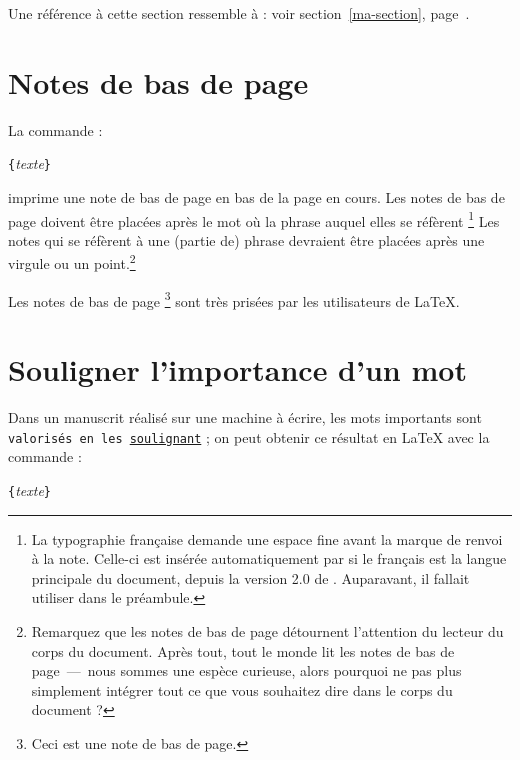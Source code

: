 \begin{example}
Une référence à cette
section\label{ma-section}
ressemble à :
\og voir section~\ref{ma-section},
page~\pageref{ma-section}.\fg
\end{example}

\section{Notes de bas de page}
La commande :
\begin{lscommand}
\verb|{|\emph{texte}\verb|}|
\end{lscommand}
\noindent imprime une note de bas de page en bas de la page en cours.
Les notes de bas de page doivent être placées après le mot où la
phrase auquel elles se réfèrent%
\footnote{La typographie française demande une espace fine avant la
marque de renvoi à la note. Celle-ci est insérée automatiquement par
 si le français est la langue principale du document, depuis la
version 2.0 de . Auparavant, il fallait utiliser
 dans le préambule. \NdT}
Les notes qui se réfèrent à une (partie de) phrase devraient être
placées après une virgule ou un point.\footnote{Remarquez que les
  notes de bas de page détournent l'attention du lecteur du corps du
  document. Après tout, tout le monde lit les notes de bas de
  page~---~nous sommes une espèce curieuse, alors pourquoi ne pas plus
  simplement intégrer tout ce que vous souhaitez dire dans le corps du
  document ?\footnotemark}
\nopagebreak[2]

\begin{example}
Les notes de bas de page
\footnote{Ceci est une note
	  de bas de page.}
sont très prisées par les
utilisateurs de \LaTeX{}.
\end{example}

\section{Souligner l'importance d'un mot}

Dans un manuscrit réalisé sur une machine à écrire, les mots
importants sont \texttt{valorisés en les \underline{soulignant}} ;
on peut obtenir ce résultat en \LaTeX{} avec la commande :
\begin{lscommand}
\verb|{|\textit{texte}\verb|}|
\end{lscommand}

